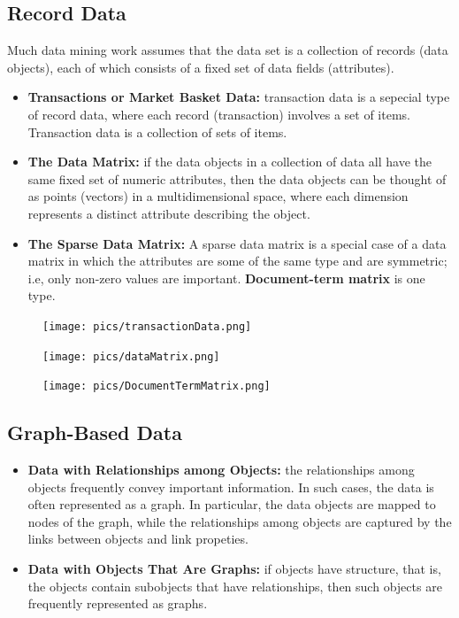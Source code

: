 		\subsection{Record Data}
		Much data mining work assumes that the data set is a collection of records (data objects), each of which consists of a fixed set of data fields (attributes).
			\begin{itemize}
				\item {\bf Transactions or Market Basket Data:} transaction data is a sepecial type of record
				data, where each record (transaction) involves a set of items. Transaction data is a collection
				of sets of items. 
				\item {\bf The Data Matrix:} if the data objects in a collection of data all have the
				same fixed set of numeric attributes, then the data objects can be thought of as points
				(vectors) in a multidimensional space, where each dimension represents a distinct attribute
				describing the object. 
				\item {\bf The Sparse Data Matrix:} A sparse data matrix is a special case of a data matrix in
				which the attributes are some of the same type and are symmetric; i.e, only non-zero values
				are important. {\bf Document-term matrix } is one type. 
			\end{itemize}

		\begin{figure}[H]
			\centering
			\texttt{[image: pics/transactionData.png]}
		\end{figure}

		\begin{figure}[H]
			\centering
			\texttt{[image: pics/dataMatrix.png]}
		\end{figure}

		\begin{figure}[H]
			\centering
			\texttt{[image: pics/DocumentTermMatrix.png]}
		\end{figure}

		\subsection{Graph-Based Data}
			\begin{itemize}
				\item {\bf Data with Relationships among Objects:} the relationships among objects frequently convey important information. In such cases, the data is often represented as a graph. In 
				particular, the data objects are mapped to nodes of the graph, while the relationships among
				objects are captured by the links between objects and link propeties. 
				\item {\bf Data with Objects That Are Graphs:} if objects have structure, that is, the objects
				contain subobjects that have relationships, then such objects are frequently represented as graphs.
			\end{itemize}

